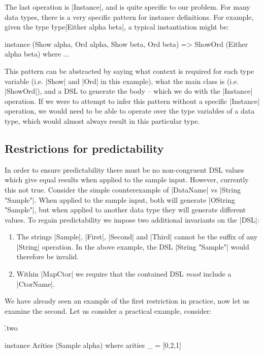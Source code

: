 \documentclass[preprint]{sigplanconf}
\begin{document}
The last operation is |Instance|, and is quite specific to our problem. For many data types, there is a very specific pattern for instance definitions. For example, given the type \h{type}|Either alpha beta|, a typical instantiation might be:

\ignore\begin{code}
instance (Show alpha, Ord alpha, Show beta, Ord beta) => ShowOrd (Either alpha beta) where
    ...
\end{code}

This pattern can be abstracted by saying what context is required for each type variable (i.e. |Show| and |Ord| in this example), what the main class is (i.e. |ShowOrd|), and a DSL to generate the body -- which we do with the |Instance| operation. If we were to attempt to infer this pattern without a specific |Instance| operation, we would need to be able to operate over the type variables of a data type, which would almost always result in this particular type.

\subsection{Restrictions for predictability}
\label{sec:predictability}

In order to ensure predictability there must be no non-congruent DSL values which give equal results when applied to the sample input. However, currently this not true. Consider the simple counterexample of |DataName| vs |String "Sample"|. When applied to the sample input, both will generate |OString "Sample"|, but when applied to another data  type they will generate different values. To regain predictability we impose two additional invariants on the |DSL|:

\begin{enumerate}
\item The strings |Sample|, |First|, |Second| and |Third| cannot be the suffix of any |String| operation. In the above example, the DSL |String "Sample"| would therefore be invalid.
\item Within |MapCtor| we require that the contained DSL \textit{must} include a |CtorName|.
\end{enumerate}

We have already seen an example of the first restriction in practice, now let us examine the second. Let us consider a practical example, consider:

\h{.two}\begin{code}
instance Arities (Sample alpha) where
    arities _ = [0,2,1]
\end{code}
\end{document}
